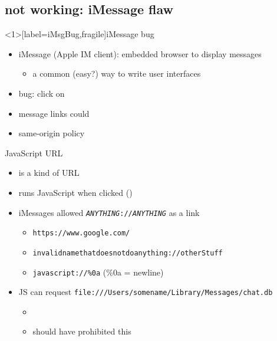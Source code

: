 
\subsection{not working: iMessage flaw}

\begin{frame}<1>[label=iMsgBug,fragile]{iMessage bug}
    \begin{itemize}
        \item iMessage (Apple IM client): embedded browser to display messages
            \begin{itemize}
            \item a common (easy?) way to write user interfaces
            \end{itemize}
        \item bug: click on 
        \vspace{.5cm}
        \item<2-> message links could 
        \item<2-> same-origin policy 
    \end{itemize}

\end{frame}


\begin{frame}{JavaScript URL}
    \begin{itemize}
        \item {} is a kind of URL
        \item runs JavaScript when clicked ()
        \item iMessages allowed \texttt{\textit{ANYTHING}://\textit{ANYTHING}} as a link
            \begin{itemize}
            \item \texttt{https://www.google.com/}
            \item \texttt{invalidnamethatdoesnotdoanything://otherStuff}
            \item \texttt{javascript://\%0a} (\%0a = newline)
            \end{itemize}
        \item JS can request \fontsize{11}{12}\texttt{file:///Users/somename/Library/Messages/chat.db}
            \begin{itemize}
                \item {}
                \item should have prohibited this
            \end{itemize}
    \end{itemize}
\end{frame}

